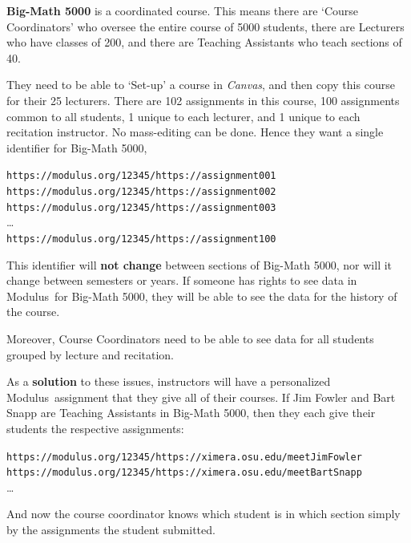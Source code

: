 \documentclass{techbrief}
\newcommand{\modulus}{\textsf{Modulus}}
\begin{document}
\break

\begin{xframe}
    \textbf{Big-Math 5000} is a coordinated course. This means there are
    `Course Coordinators' who oversee the entire course of 5000 students,
    there are Lecturers who have classes of 200, and there are Teaching
    Assistants who teach sections of 40.

    They need to be able to `Set-up' a course in \textsl{Canvas}, and then copy
    this course for their 25 lecturers. There are 102 assignments in this
    course, 100 assignments common to all students, 1 unique to each lecturer,
    and 1 unique to each recitation
    instructor. No mass-editing can be done. Hence they want a single
    identifier for
    Big-Math 5000,
    \begin{center}\scriptsize
        \texttt{https://modulus.org/12345/https://assignment001}\\
        \texttt{https://modulus.org/12345/https://assignment002}\\
        \texttt{https://modulus.org/12345/https://assignment003}\\
        \dots\\
        \texttt{https://modulus.org/12345/https://assignment100}\\
    \end{center}
    This identifier will \textbf{not change} between sections of Big-Math 5000,
    nor will it change between semesters or years. If someone has rights to see
    data in \modulus\ for Big-Math 5000, they will be able to see the data for
    the history of the course.

    Moreover, Course Coordinators need to be able to see data for all students
    grouped by lecture and recitation.

    As a \textbf{solution} to these issues, instructors will have a
    personalized
    \modulus\ assignment that they give all of their courses. If Jim Fowler and
    Bart Snapp are Teaching Assistants in Big-Math 5000, then they each give
    their
    students the respective assignments:
    \begin{center}\scriptsize

        \texttt{https://modulus.org/12345/https://ximera.osu.edu/meetJimFowler}\\

        \texttt{https://modulus.org/12345/https://ximera.osu.edu/meetBartSnapp}\\
        \dots
    \end{center}
    And now the course coordinator knows which student is in which section
    simply by the assignments the student submitted.
\end{xframe}
\end{document}

